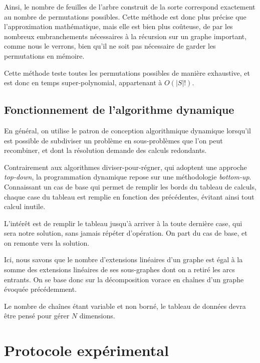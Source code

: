 \documentclass[10pt,a4paper]{article}
\begin{document}
Ainsi, le nombre de feuilles de l'arbre construit de la sorte correspond exactement au nombre de permutations possibles. Cette méthode est donc plus précise que l'approximation mathématique, mais elle est bien plus coûteuse, de par les nombreux embranchements nécessaires à la récursion sur un graphe important, comme nous le verrons, bien qu'il ne soit pas nécessaire de garder les permutations en mémoire.


Cette méthode teste toutes les permutations possibles de manière exhaustive, et est donc en temps super-polynomial, appartenant à $ O (|S|!) $.

\subsection{Fonctionnement de l'algorithme dynamique}

En général, on utilise le patron de conception algorithmique dynamique lorsqu'il est possible de subdiviser un problème en sous-problèmes que l'on peut recombiner, et dont la résolution demande des calculs redondants.

Contrairement aux algorithmes diviser-pour-régner, qui adoptent une approche \textit{top-down}, la programmation dynamique repose sur une méthodologie \textit{bottom-up}. Connaissant un cas de base qui permet de remplir les \og bords \fg du tableau de calculs, chaque case du tableau est remplie en fonction des précédentes, évitant ainsi tout calcul inutile.

L'intérêt est de remplir le tableau jusqu'à arriver à la toute dernière case, qui sera notre solution, sans jamais répéter d'opération. On part du cas de base, et on remonte vers la solution.

Ici, nous savons que le nombre d'extensions linéaires d'un graphe est égal à la somme des extensions linéaires de ses sous-graphes dont on a retiré les arcs entrants. On se base donc sur la décomposition vorace en chaînes d'un graphe évoquée précédemment.

Le nombre de chaînes étant variable et non borné, le tableau de données devra être pensé pour gérer $ N $ dimensions.

\section{Protocole expérimental}
\end{document}
